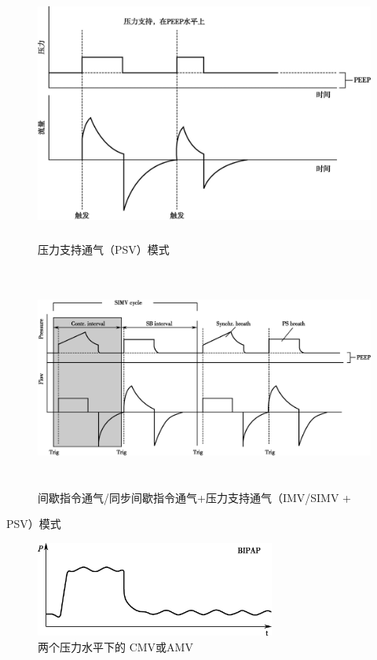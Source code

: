 \begin{figure}[!htbp]
 \centering
 \includegraphics[width=5.16667in,height=3.3125in]{./images/Image00510.jpg}
 \captionsetup{justification=centering}
 \caption{压力支持通气（PSV）模式}
 \label{fig136-4}
  \end{figure} 

\begin{figure}[!htbp]
 \centering
 \includegraphics[width=6.15625in,height=2.89583in]{./images/Image00511.jpg}
 \captionsetup{justification=centering}
 \caption{间歇指令通气/同步间歇指令通气+压力支持通气（IMV/SIMV +}
 \label{fig136-5}
  \end{figure} 
PSV）模式

\begin{figure}[!htbp]
 \centering
 \includegraphics[width=3.10417in,height=1.22917in]{./images/Image00512.jpg}
 \captionsetup{justification=centering}
 \caption{两个压力水平下的 CMV或AMV}
 \label{fig136-6}
  \end{figure} 

